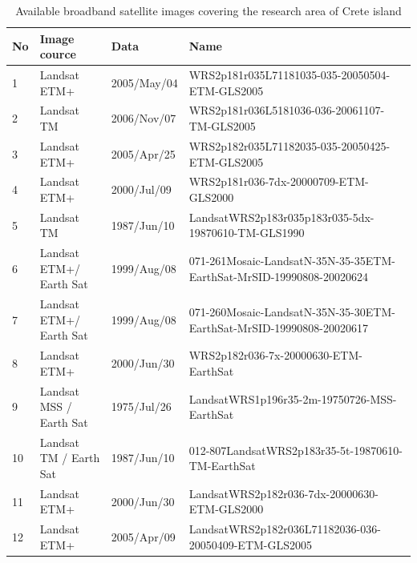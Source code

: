 \documentclass[10pt, a4paper]{article}
\begin{document}
\begin{appendices}
\begin{table}
\caption{Available broadband satellite images covering the research area of Crete island}
\centering
{}
  \begin{tabular}{| p{1cm} | p{3cm} | p{2cm} | p{5cm} |}
    \hline
    \textbf{No} & \textbf{Image cource} & \textbf{Data} & \textbf{Name} \\ \hline \hline
     1 & Landsat ETM+ & 2005/May/04 & WRS2p181r035L71181035-035-20050504-ETM-GLS2005 \\ \hline
     2 & Landsat TM & 2006/Nov/07 & WRS2p181r036L5181036-036-20061107-TM-GLS2005 \\ \hline
     3 & Landsat ETM+ & 2005/Apr/25 & WRS2p182r035L71182035-035-20050425-ETM-GLS2005 \\ \hline
     4 & Landsat ETM+ & 2000/Jul/09 & WRS2p181r036-7dx-20000709-ETM-GLS2000 \\ \hline
     5 & Landsat TM & 1987/Jun/10 & LandsatWRS2p183r035p183r035-5dx-19870610-TM-GLS1990 \\ \hline
     6 & Landsat ETM+/ Earth Sat & 1999/Aug/08 & 071-261Mosaic-LandsatN-35N-35-35ETM-EarthSat-MrSID-19990808-20020624 \\ \hline
     7 & Landsat ETM+/ Earth Sat & 1999/Aug/08 & 071-260Mosaic-LandsatN-35N-35-30ETM-EarthSat-MrSID-19990808-20020617 \\ \hline
     8 & Landsat ETM+ & 2000/Jun/30 & WRS2p182r036-7x-20000630-ETM-EarthSat \\ \hline
     9 & Landsat MSS / Earth Sat & 1975/Jul/26 & LandsatWRS1p196r35-2m-19750726-MSS-EarthSat \\ \hline
    10 & Landsat TM / Earth Sat & 1987/Jun/10 & 012-807LandsatWRS2p183r35-5t-19870610-TM-EarthSat \\ \hline
    11 & Landsat ETM+ & 2000/Jun/30 & LandsatWRS2p182r036-7dx-20000630-ETM-GLS2000 \\ \hline
    12 & Landsat ETM+ & 2005/Apr/09 & LandsatWRS2p182r036L71182036-036-20050409-ETM-GLS2005 \\ \hline
  \end{tabular}
\label{tab:20}
\end{table}


\end{appendices}
\end{document}
